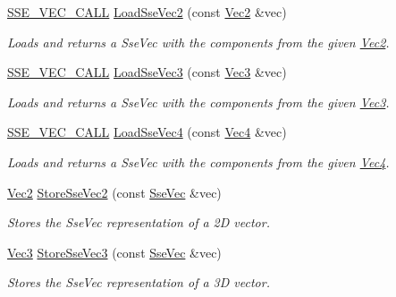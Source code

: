 \begin{DoxyCompactItemize}
\hyperlink{ssevec__math__defs_8h_a97454f977a5281455cecacce1e8ba670}{S\+S\+E\+\_\+\+V\+E\+C\+\_\+\+C\+A\+L\+L} \hyperlink{group___s_i_m_d_vec_math_gaa2e01e9477a52d4e75199162069ab587}{Load\+Sse\+Vec2} (const \hyperlink{classgfxmath_1_1_vec2}{Vec2} \&vec)
\begin{DoxyCompactList}\small\item\em Loads and returns a Sse\+Vec with the components from the given \hyperlink{classgfxmath_1_1_vec2}{Vec2}. \end{DoxyCompactList}\item 
\hyperlink{ssevec__math__defs_8h_a97454f977a5281455cecacce1e8ba670}{S\+S\+E\+\_\+\+V\+E\+C\+\_\+\+C\+A\+L\+L} \hyperlink{group___s_i_m_d_vec_math_ga7497f563df5d1254d1f62a880e6f6af8}{Load\+Sse\+Vec3} (const \hyperlink{classgfxmath_1_1_vec3}{Vec3} \&vec)
\begin{DoxyCompactList}\small\item\em Loads and returns a Sse\+Vec with the components from the given \hyperlink{classgfxmath_1_1_vec3}{Vec3}. \end{DoxyCompactList}\item 
\hyperlink{ssevec__math__defs_8h_a97454f977a5281455cecacce1e8ba670}{S\+S\+E\+\_\+\+V\+E\+C\+\_\+\+C\+A\+L\+L} \hyperlink{group___s_i_m_d_vec_math_gad02605b7686cd42f188e6aa7ef1062b8}{Load\+Sse\+Vec4} (const \hyperlink{classgfxmath_1_1_vec4}{Vec4} \&vec)
\begin{DoxyCompactList}\small\item\em Loads and returns a Sse\+Vec with the components from the given \hyperlink{classgfxmath_1_1_vec4}{Vec4}. \end{DoxyCompactList}\item 
\hyperlink{classgfxmath_1_1_vec2}{Vec2} \hyperlink{group___s_i_m_d_vec_math_ga7aee046af0575fbd949e7d51c0bdeb7b}{Store\+Sse\+Vec2} (const \hyperlink{namespacegfxmath_a0de2243e2b8d0fd46d3af5e036423004}{Sse\+Vec} \&vec)
\begin{DoxyCompactList}\small\item\em Stores the Sse\+Vec representation of a 2\+D vector. \end{DoxyCompactList}\item 
\hyperlink{classgfxmath_1_1_vec3}{Vec3} \hyperlink{group___s_i_m_d_vec_math_gaf57f50238af36470ad18c1418e875d31}{Store\+Sse\+Vec3} (const \hyperlink{namespacegfxmath_a0de2243e2b8d0fd46d3af5e036423004}{Sse\+Vec} \&vec)
\begin{DoxyCompactList}\small\item\em Stores the Sse\+Vec representation of a 3\+D vector. \end{DoxyCompactList}\item 

\end{DoxyCompactItemize}
